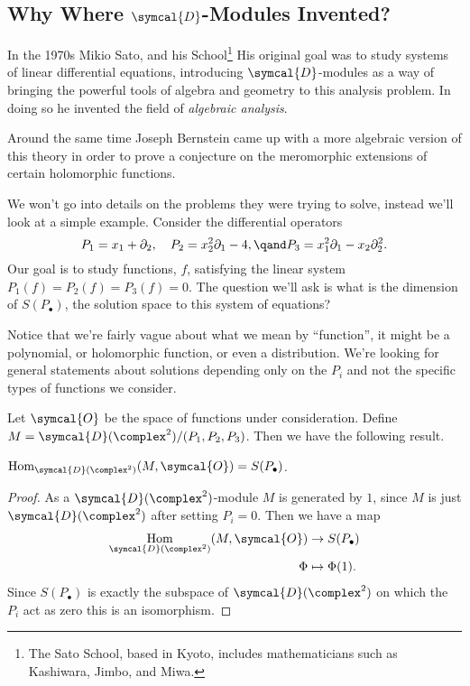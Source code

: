 \documentclass[fleqn]{NotesClass}
\newcommand{\D}{\symcal{D}}
\newcommand{\sheaf}[1]{\symcal{#1}}
\DeclareMathOperator{\Hom}{Hom}
\begin{document}
    \subsection{Why Where \texorpdfstring{\(\D\)}{D}-Modules Invented?}
    In the 1970s Mikio Sato, and his School\footnote{The Sato School, based in Kyoto, includes mathematicians such as Kashiwara, Jimbo, and Miwa.}
    His original goal was to study systems of linear differential equations, introducing \(\D\)-modules as a way of bringing the powerful tools of algebra and geometry to this analysis problem.
    In doing so he invented the field of \emph{algebraic analysis}.
    
    Around the same time Joseph Bernstein came up with a more algebraic version of this theory in order to prove a conjecture on the meromorphic extensions of certain holomorphic functions.
    
    We won't go into details on the problems they were trying to solve, instead we'll look at a simple example.
    Consider the differential operators
    \begin{equation}
        P_1 = x_1 + \partial_2, \quad P_2 = x_2^2 \partial_1 - 4, \qand P_3 = x_1^2 \partial_1 - x_2 \partial_2^2.
    \end{equation}
    Our goal is to study functions, \(f\), satisfying the linear system \(P_1(f) = P_2(f) = P_3(f) = 0\).
    The question we'll ask is what is the dimension of \(S(P_{\bullet})\), the solution space to this system of equations?
    
    Notice that we're fairly vague about what we mean by \enquote{function}, it might be a polynomial, or holomorphic function, or even a distribution.
    We're looking for general statements about solutions depending only on the \(P_i\) and not the specific types of functions we consider.
    
    Let \(\sheaf{O}\) be the space of functions under consideration.
    Define \(M = \D(\complex^2) / (P_1, P_2, P_3)\).
    Then we have the following result.
    
    \begin{lma}{}{}
        \(\Hom_{\D(\complex^2)}(M, \sheaf{O}) = S(P_{\bullet})\).
        \begin{proof}
            As a \(\D(\complex^2)\)-module \(M\) is generated by \(1\), since \(M\) is just \(\D(\complex^2)\) after setting \(P_i = 0\).
            Then we have a map
            \begin{align}
                \Hom_{\D(\complex^2)}(M, \sheaf{O}) &\to S(P_{\bullet})\\
                \Phi &\mapsto \Phi(1).
            \end{align}
            Since \(S(P_{\bullet})\) is exactly the subspace of \(\D(\complex^2)\) on which the \(P_i\) act as zero this is an isomorphism.
        \end{proof}
    \end{lma}
    
\end{document}
